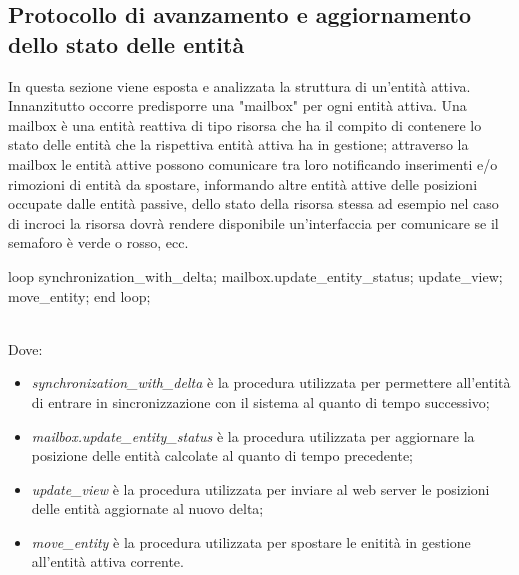 \subsection{Protocollo di avanzamento e aggiornamento dello stato delle entità}
In questa sezione viene esposta e analizzata la struttura di un'entità attiva. Innanzitutto occorre predisporre una "mailbox" per ogni entità attiva. Una mailbox è una entità reattiva di tipo risorsa che ha il compito di contenere lo stato delle entità che la rispettiva entità attiva ha in gestione; attraverso la mailbox le entità attive possono comunicare tra loro notificando inserimenti e/o rimozioni di entità da spostare, informando altre entità attive delle posizioni occupate dalle entità passive, dello stato della risorsa stessa ad esempio nel caso di incroci la risorsa dovrà rendere disponibile un'interfaccia per comunicare se il semaforo è verde o rosso, ecc.

\begin{codiceada}[caption={Template-Code entità attiva}, label=template-code]
loop
	synchronization_with_delta;
	mailbox.update_entity_status;	
	update_view;	
	move_entity;
end loop;
\end{codiceada}
\\
Dove:
\begin{itemize}
\item \textit{synchronization\_with\_delta} è la procedura utilizzata per permettere all'entità di entrare in sincronizzazione con il sistema al quanto di tempo successivo;
\item \textit{mailbox.update\_entity\_status} è la procedura utilizzata per aggiornare la posizione delle entità calcolate al quanto di tempo precedente; \item \textit{update\_view} è la procedura utilizzata per inviare al web server le posizioni delle entità aggiornate al nuovo delta;
\item \textit{move\_entity} è la procedura utilizzata per spostare le enitità in gestione all'entità attiva corrente.
\end{itemize}

